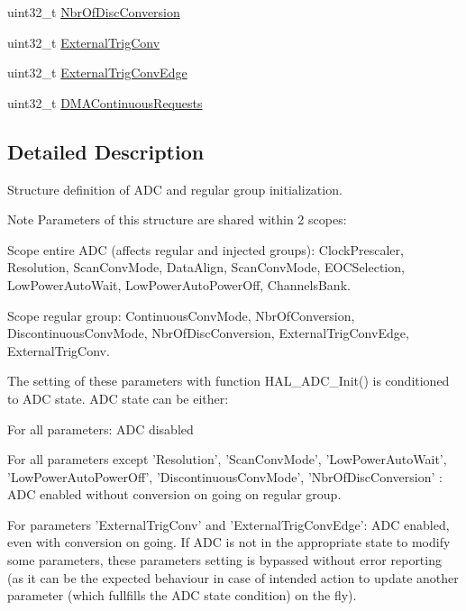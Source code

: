 \begin{DoxyCompactItemize}
\item 
uint32\-\_\-t \hyperlink{struct_a_d_c___init_type_def_a5c0078be814bfe2608ae5758826eafb8}{Nbr\-Of\-Disc\-Conversion}
\item 
uint32\-\_\-t \hyperlink{struct_a_d_c___init_type_def_a47aba277f9d8f3c5774983de4ce9455b}{External\-Trig\-Conv}
\item 
uint32\-\_\-t \hyperlink{struct_a_d_c___init_type_def_aeed14631d5f1d118a252ea24edd68ede}{External\-Trig\-Conv\-Edge}
\item 
uint32\-\_\-t \hyperlink{struct_a_d_c___init_type_def_afa360066652d6e8a2a3f56426b756fab}{D\-M\-A\-Continuous\-Requests}
\end{DoxyCompactItemize}


\subsection{Detailed Description}
Structure definition of A\-D\-C and regular group initialization. 

\begin{DoxyNote}{Note}
Parameters of this structure are shared within 2 scopes\-:
\begin{DoxyItemize}
\item Scope entire A\-D\-C (affects regular and injected groups)\-: Clock\-Prescaler, Resolution, Scan\-Conv\-Mode, Data\-Align, Scan\-Conv\-Mode, E\-O\-C\-Selection, Low\-Power\-Auto\-Wait, Low\-Power\-Auto\-Power\-Off, Channels\-Bank.
\item Scope regular group\-: Continuous\-Conv\-Mode, Nbr\-Of\-Conversion, Discontinuous\-Conv\-Mode, Nbr\-Of\-Disc\-Conversion, External\-Trig\-Conv\-Edge, External\-Trig\-Conv. 
\end{DoxyItemize}

The setting of these parameters with function H\-A\-L\-\_\-\-A\-D\-C\-\_\-\-Init() is conditioned to A\-D\-C state. A\-D\-C state can be either\-:
\begin{DoxyItemize}
\item For all parameters\-: A\-D\-C disabled
\item For all parameters except 'Resolution', 'Scan\-Conv\-Mode', 'Low\-Power\-Auto\-Wait', 'Low\-Power\-Auto\-Power\-Off', 'Discontinuous\-Conv\-Mode', 'Nbr\-Of\-Disc\-Conversion' \-: A\-D\-C enabled without conversion on going on regular group.
\item For parameters 'External\-Trig\-Conv' and 'External\-Trig\-Conv\-Edge'\-: A\-D\-C enabled, even with conversion on going. If A\-D\-C is not in the appropriate state to modify some parameters, these parameters setting is bypassed without error reporting (as it can be the expected behaviour in case of intended action to update another parameter (which fullfills the A\-D\-C state condition) on the fly). 
\end{DoxyItemize}
\end{DoxyNote}


